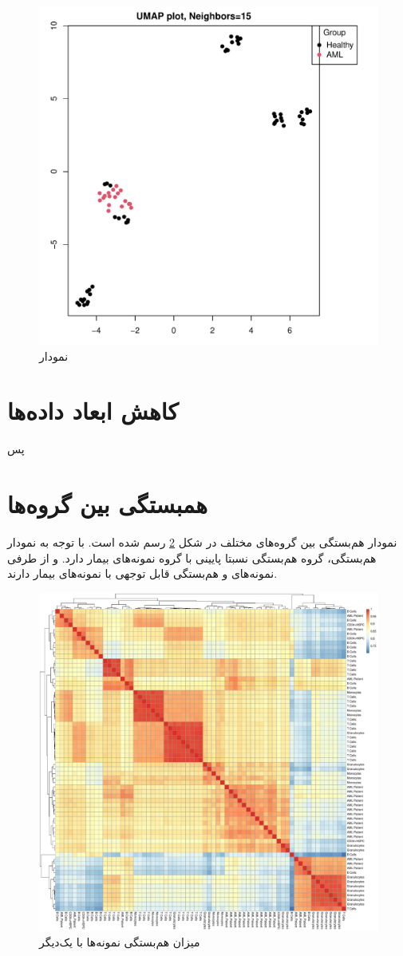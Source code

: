 \documentclass{article}
\begin{document}
\begin{figure}[h!]
	\centering
	\includegraphics[width=0.5\columnwidth]{figs/umap.pdf}
	\caption{نمودار }
	\label{fig:umap}
\end{figure}

\section{کاهش ابعاد داده‌‌ها}
پس
\section{همبستگی بین گروه‌ها}
نمودار هم‌بستگی بین گروه‌های مختلف در شکل \ref{fig:sourcename-cor-heatmap} رسم شده است.
با توجه به نمودار هم‌بستگی، گروه  هم‌بستگی نسبتا پایینی با گروه نمونه‌های بیمار دارد. 
و از طرفی نمونه‌های  و  هم‌بستگی قابل توجهی با نمونه‌های بیمار دارند.

\begin{figure}[h!]
	\centering
	\includegraphics[width=0.8\columnwidth]{figs/SourceName-Cor-Heatmap.pdf}
	\caption{میزان هم‌بستگی نمونه‌ها با یک‌دیگر}
	\label{fig:sourcename-cor-heatmap}
\end{figure}
\end{document}
